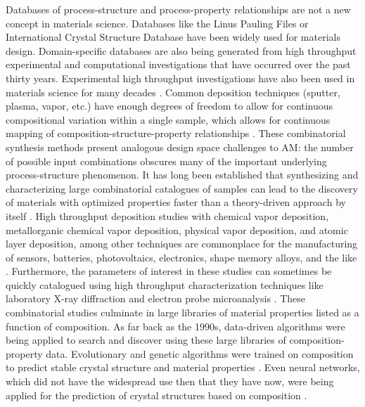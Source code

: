 Databases of process-structure and process-property relationships are not a new concept in materials science. Databases like the Linus Pauling Files or International Crystal Structure Database have been widely used for materials design. Domain-specific databases are also being generated from high throughput experimental and computational investigations that have occurred over the past thirty years. Experimental high throughput investigations have also been used in materials science for many decades \cite{Xiang1995}. Common deposition techniques (sputter, plasma, vapor, etc.) have enough degrees of freedom to allow for continuous compositional variation within a single sample, which allows for continuous mapping of composition-structure-property relationships \cite{Long2007, Long2009, Kusne2015a}. These combinatorial synthesis methods present analogous design space challenges to AM: the number of possible input combinations obscures many of the important underlying process-structure phenomenon. It has long been established that synthesizing and characterizing large combinatorial catalogues of samples can lead to the discovery of materials with optimized properties faster than a theory-driven approach by itself \cite{Ceder1998, Pilania2013}. High throughput deposition studies with chemical vapor deposition, metallorganic chemical vapor deposition, physical vapor deposition, and atomic layer deposition, among other techniques are commonplace for the manufacturing of sensors, batteries, photovoltaics, electronics, shape memory alloys, and the like \cite{Hampden-Smith1995, Gilmer1998, Mercey1999, Mitzi2001, Cui2006,Dwivedi2008, Jin2013}. Furthermore, the parameters of interest in these studies can sometimes be quickly catalogued using high throughput characterization techniques like laboratory X-ray diffraction and electron probe microanalysis \cite{Gregoire2014, Ren2017}. These combinatorial studies culminate in large libraries of material properties listed as a function of composition. As far back as the 1990s, data-driven algorithms were being applied to search and discover using these large libraries of composition-property data. Evolutionary and genetic algorithms were trained on composition to predict stable crystal structure and material properties \cite{Deaven1995, Morris1996, Woodley1999, Stucke2003, Wolf2000}. Even neural networks, which did not have the widespread use then that they have now, were being applied for the prediction of crystal structures based on composition \cite{Sumpter1996}.

